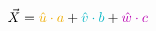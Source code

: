\documentclass[preview]{standalone}
\begin{document}
$$\vec{X} = \textcolor[HTML]{efac00}{\hat{u}\cdot a} + \textcolor[HTML]{00b4c4}{\hat{v}\cdot b} + \textcolor[HTML]{ba00b2}{\hat{w}\cdot c}$$
\end{document}
